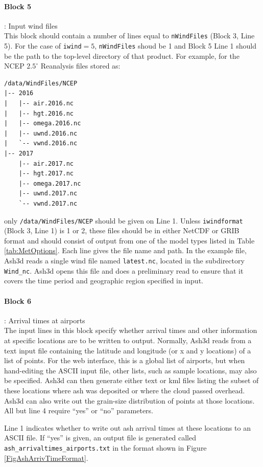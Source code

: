 \paragraph{Block 5}: Input wind files\\
This block should contain a number of lines equal to \texttt{nWindFiles} (Block 3, Line 5).
For the case of \texttt{iwind}$=5$, \texttt{nWindFiles} shoud be 1 and Block 5 Line 1
should be the path to the top-level directory of that product.  For example, for the
NCEP $2.5^{\circ}$ Reanalysis files stored as:
\begin{verbatim}
/data/WindFiles/NCEP
|-- 2016
|   |-- air.2016.nc
|   |-- hgt.2016.nc
|   |-- omega.2016.nc
|   |-- uwnd.2016.nc
|   `-- vwnd.2016.nc
|-- 2017
    |-- air.2017.nc
    |-- hgt.2017.nc
    |-- omega.2017.nc
    |-- uwnd.2017.nc
    `-- vwnd.2017.nc
\end{verbatim}
only \texttt{/data/WindFiles/NCEP} should be given on Line 1.
Unless \texttt{iwindformat} (Block 3, Line 1) is 1 or 2, these files should be in
either NetCDF or GRIB
format and should consist of output from one of the model types listed in
Table \ref{tab:MetOptions}.
Each line gives the file name and path. In the example file, Ash3d reads a single
wind file named \texttt{latest.nc}, located in the subdirectory \texttt{Wind\_nc}.
Ash3d opens this
file and does a preliminary read to ensure that it covers the time period and
geographic region specified in input.

\paragraph{Block 6}: Arrival times at airports\\
The input lines in this block specify whether arrival times and other information
at specific locations are to be written to output. Normally, Ash3d reads from a
text input file containing the latitude and longitude (or x and y locations) of
a list of points. For the web interface, this is a global list of airports, but
when hand-editing the ASCII input file, other lists, such as sample locations, may
also be specified. Ash3d can then generate either text or kml files listing the
subset of these locations where ash was deposited or where the cloud passed overhead.
Ash3d can also write out the grain-size distribution of points at those locations.
All but line 4 require ``yes'' or ``no'' parameters.

Line 1 indicates whether to write out ash arrival times at these locations to an
ASCII file. If ``yes'' is given, an output file is generated called
\texttt{ash\_arrivaltimes\_airports.txt}
in the format shown in Figure \ref{FigAshArrivTimeFormat}.

